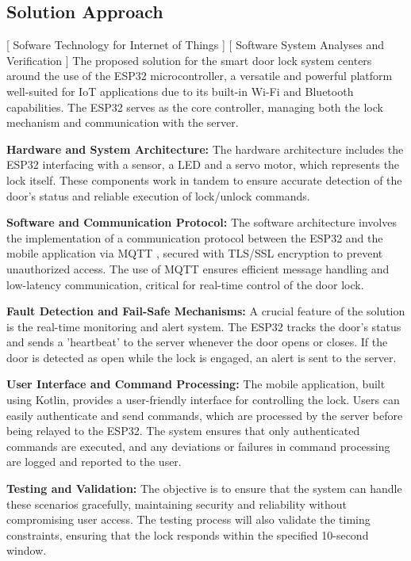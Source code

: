 \subsection{Solution Approach}
[ Sofware Technology for Internet of Things ] [ Software System Analyses and Verification ]
\newline
The proposed solution for the smart door lock system centers around the use of the ESP32 microcontroller, a versatile and powerful platform well-suited for IoT applications due to its built-in Wi-Fi and Bluetooth capabilities. The ESP32 serves as the core controller, managing both the lock mechanism and communication with the server.

\textbf{Hardware and System Architecture:}
The hardware architecture includes the ESP32 interfacing with a sensor, a LED and a servo motor, which represents the lock itself. These components work in tandem to ensure accurate detection of the door’s status and reliable execution of lock/unlock commands.

\textbf{Software and Communication Protocol:}
The software architecture involves the implementation of a communication protocol between the ESP32 and the mobile application via MQTT \cite{mqtt-protocol}, secured with TLS/SSL encryption to prevent unauthorized access. The use of MQTT ensures efficient message handling and low-latency communication, critical for real-time control of the door lock.

\textbf{Fault Detection and Fail-Safe Mechanisms:}
A crucial feature of the solution is the real-time monitoring and alert system. The ESP32 tracks the door's status and sends a 'heartbeat' to the server whenever the door opens or closes. If the door is detected as open while the lock is engaged, an alert is sent to the server.

\textbf{User Interface and Command Processing:}
The mobile application, built using Kotlin, provides a user-friendly interface for controlling the lock. Users can easily authenticate and send commands, which are processed by the server before being relayed to the ESP32. The system ensures that only authenticated commands are executed, and any deviations or failures in command processing are logged and reported to the user.

\textbf{Testing and Validation:}
 The objective is to ensure that the system can handle these scenarios gracefully, maintaining security and reliability without compromising user access. The testing process will also validate the timing constraints, ensuring that the lock responds within the specified 10-second window.

